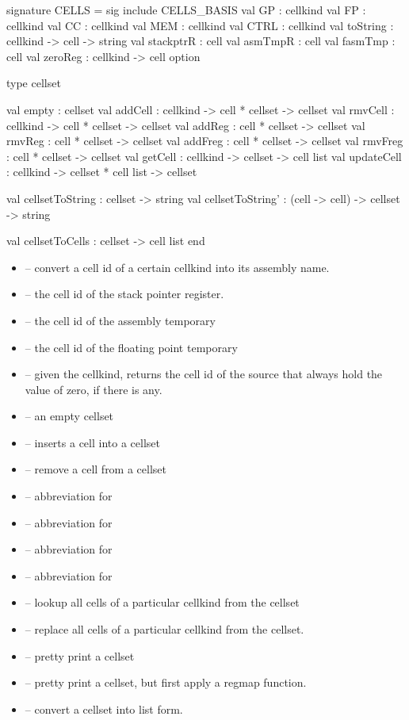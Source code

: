 \begin{SML}
signature CELLS = sig
   include CELLS_BASIS
   val GP   : cellkind 
   val FP   : cellkind
   val CC   : cellkind 
   val MEM  : cellkind 
   val CTRL : cellkind 
   val toString : cellkind -> cell -> string
   val stackptrR : cell 
   val asmTmpR : cell  
   val fasmTmp : cell 
   val zeroReg : cellkind -> cell option

   type cellset

   val empty      : cellset
   val addCell    : cellkind -> cell * cellset -> cellset
   val rmvCell    : cellkind -> cell * cellset -> cellset
   val addReg     : cell * cellset -> cellset
   val rmvReg     : cell * cellset -> cellset
   val addFreg    : cell * cellset -> cellset
   val rmvFreg    : cell * cellset -> cellset
   val getCell    : cellkind -> cellset -> cell list
   val updateCell : cellkind -> cellset * cell list -> cellset

   val cellsetToString : cellset -> string
   val cellsetToString' : (cell -> cell) -> cellset -> string

   val cellsetToCells : cellset -> cell list
end
\end{SML}

\begin{itemize} 
  \item {} -- convert a cell id of a certain cellkind into
its assembly name.
  \item {} -- the cell id of the stack pointer register. 
  \item {} -- the cell id of the assembly temporary 
  \item {} -- the cell id of the floating point temporary
  \item {} -- given the cellkind, returns the cell id of the
   source that always hold the value of zero, if there is any. 
  \item {} -- an empty cellset
  \item {} -- inserts a cell into a cellset
  \item {} -- remove a cell from a cellset
  \item {} -- abbreviation for 
  \item {} -- abbreviation for  
  \item {} -- abbreviation for 
  \item {} -- abbreviation for  
  \item {} -- lookup all cells of a particular cellkind from
the cellset
  \item {} -- replace all cells of a particular cellkind
from the cellset. 
   \item {} -- pretty print a cellset 
   \item {} -- pretty print a cellset, but first
apply a regmap function.
   \item {} -- convert a cellset into list form.
\end{itemize}
